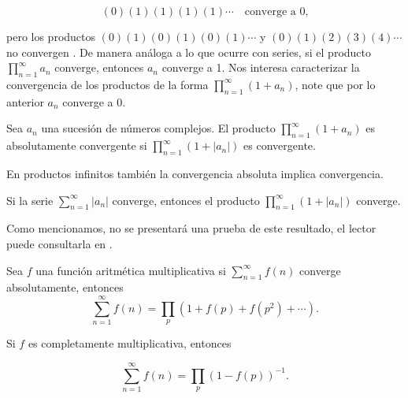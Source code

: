 $$(0)(1)(1)(1)(1)\cdots \quad \text{converge a 0,}$$

pero los productos $(0)(1)(0)(1)(0)(1)\cdots$ y $(0)(1)(2)(3)(4)\cdots$ no convergen \cite{pongsriiam2023analytic}. De manera análoga a lo que ocurre con series, si el producto $\displaystyle\prod_{n=1}^{\infty} a_n$ converge, entonces $a_n$ converge a 1. Nos interesa caracterizar la convergencia de los productos de la forma $\displaystyle \prod_{n=1}^{\infty} (1+a_n)$, note que por lo anterior $a_n$ converge a 0.

\begin{definition}
Sea $a_n$ una sucesión de números complejos. El producto $\displaystyle\prod_{n=1}^{\infty} (1+a_n)$ es absolutamente convergente si $\displaystyle\prod_{n=1}^{\infty} (1+\left|a_n\right|)$ es convergente.
\end{definition}

En productos infinitos también la convergencia absoluta implica convergencia.

\begin{theorem}
Si la serie $\displaystyle\sum_{n=1}^{\infty} |a_n|$ converge, entonces el producto $\displaystyle\prod_{n=1}^{\infty} (1+|a_n|)$ converge.
\end{theorem}

Como mencionamos, no se presentará una prueba de este resultado, el lector puede consultarla en \cite{Apostol:105425}.

\begin{theorem}
Sea $f$ una función aritmética multiplicativa si $\displaystyle\sum_{n=1}^{\infty} f(n)$ converge absolutamente, entonces
$$\sum_{n=1}^{\infty} f(n)=\prod_p\left(1+f(p)+f\left(p^2\right)+\cdots\right).$$

Si $f$ es completamente multiplicativa, entonces

$$\sum_{n=1}^{\infty} f(n)=\prod_p(1-f(p))^{-1}.$$
\end{theorem}

